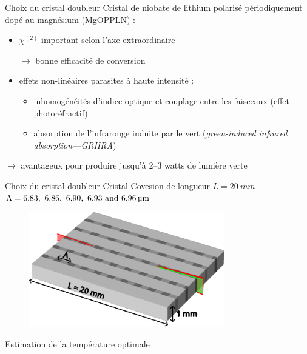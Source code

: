 \documentclass{beamer}
\begin{document}
\begin{frame}{Choix du cristal doubleur}
Cristal de niobate de lithium polarisé périodiquement dopé au magnésium (MgO\hc PPLN) :
\begin{itemize}
\item $\chi^{(2)}$ important selon l'axe extraordinaire
\item[$\rightarrow$] bonne efficacité de conversion
\item effets non-linéaires parasites à haute intensité :
\begin{itemize}
\item inhomogénéités d'indice optique et couplage entre les faisceaux (effet photoréfractif)
\item absorption de l'infrarouge induite par le vert (\textit{green-induced infrared absorption---GRIIRA})
\end{itemize}
\end{itemize}
$\boldsymbol\rightarrow$ avantageux pour produire jusqu'à 2--3 watts de lumière verte
\end{frame}

\begin{frame}{Choix du cristal doubleur}
Cristal Covesion de longueur $L=\SI{20}{mm}$ \\
$\Lambda = \qtylist[list-units = single]{6.83; 6.86 ; 6.90 ; 6.93 ; 6,96}{\micro\meter}$
\begin{figure}
\centering
\includegraphics[height=5cm]{img/cristal2.pdf} %
\end{figure}
\end{frame}

\begin{frame}{Estimation de la température optimale}
\centering


\end{frame}
\end{document}
